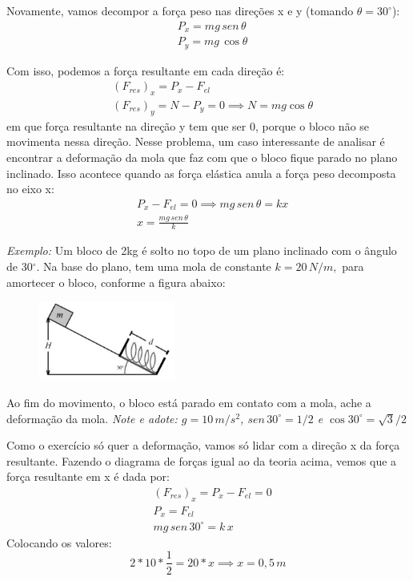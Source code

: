 \documentclass[12pt]{extarticle}
\newcommand{\<}{\langle}
\renewcommand{\>}{\rangle}
\theoremstyle{definition}
\begin{document}
Novamente, vamos decompor a força peso nas direções x e y (tomando $\theta=30^\circ$):
\begin{align*}
    &P_x = mg\,sen\,\theta \\
    &P_y = mg\,\cos\theta
\end{align*}

Com isso, podemos a força resultante em cada direção é:
\begin{align*}
    &(F_{res})_x = P_x - F_{el}\\
    &(F_{res})_y = N - P_y = 0 \implies N = mg\cos\theta
\end{align*}
\noindent em que força resultante na direção y tem que ser 0, porque o bloco não se movimenta nessa direção. Nesse problema, um caso interessante de analisar é encontrar a deformação da mola que faz com que o bloco fique parado no plano inclinado. Isso acontece quando as força elástica anula a força peso decomposta no eixo x:
\begin{align*}
    &P_x - F_{el} =0 \implies mg\,sen\,\theta = kx\\
    & \boxed{x = \frac{mg\,sen\,\theta}{k}}
\end{align*}

\textit{Exemplo:} Um bloco de 2kg é solto no topo de um plano inclinado com o ângulo de 30$^\circ$. Na base do plano, tem uma mola de constante $k=20\,N/m,$ para amortecer o bloco, conforme a figura abaixo:
\begin{figure}[H]
    \centering
    \includegraphics[width=0.4\textwidth]{forum11.jpg}
    \label{fig:ex_mola}
\end{figure}

Ao fim do movimento, o bloco está parado em contato com a mola, ache a deformação da mola. \textit{Note e adote: $g=10\,m/s^2$, $sen\,30^\circ = 1/2$ e $\cos30^\circ = \sqrt{3}/2$}

Como o exercício só quer a deformação, vamos só lidar com a direção x da força resultante. Fazendo o diagrama de forças igual ao da teoria acima, vemos que a força resultante em x é dada por:
\begin{align*}
    &(F_{res})_{x} = P_x - F_{el} =0\\
    &P_x = F_{el}\\
    &mg\,sen\,30^\circ = k\,x
\end{align*}
Colocando os valores:
\begin{equation*}
    2*10*\frac{1}{2} = 20*x \implies x= 0,5\, m
\end{equation*}
\end{document}
